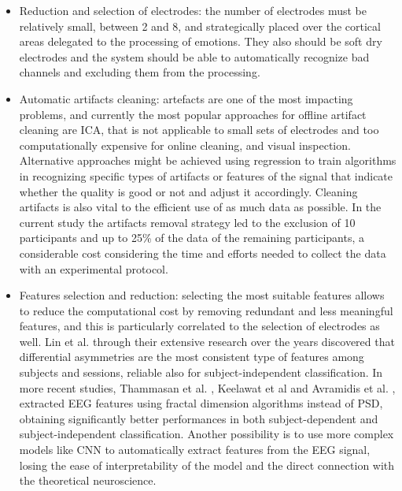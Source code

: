 \begin{itemize}
\item 	Reduction and selection of electrodes: the number of electrodes must be relatively small, between 2 and 8, and strategically placed over the cortical areas delegated to the processing of emotions. They also should be soft dry electrodes and the system should be able to automatically recognize bad channels and excluding them from the processing.
\item 	Automatic artifacts cleaning: artefacts are one of the most impacting problems, and currently the most popular approaches for offline artifact cleaning are \ac{ICA}, that is not applicable to small sets of electrodes and too computationally expensive for online cleaning, and visual inspection. Alternative approaches might be achieved using regression to train algorithms in recognizing specific types of artifacts or features of the signal that indicate whether the quality is good or not and adjust it accordingly. Cleaning artifacts is also vital to the efficient use of as much data as possible. In the current study the artifacts removal strategy led to the exclusion of 10 participants and up to 25\% of the data of the remaining participants, a considerable cost considering the time and efforts needed to collect the data with an experimental protocol.
\item 	Features selection and reduction: selecting the most suitable features allows to reduce the computational cost by removing redundant and less meaningful features, and this is particularly correlated to the selection of electrodes as well. Lin et al. \cite{lin_toward_2015} through their extensive research over the years discovered that differential asymmetries are the most consistent type of features among subjects and sessions, reliable also for subject-independent classification. In more recent studies, Thammasan et al. \cite{thammasan_continuous_2016}, Keelawat et al \cite{keelawat_comparative_2021} and Avramidis et al. \cite{avramidis_multiscale_2021} , extracted \ac{EEG} features using fractal dimension algorithms instead of \ac{PSD}, obtaining significantly better performances in both subject-dependent and subject-independent classification. Another possibility is to use more complex models like \ac{CNN} \cite{keelawat_comparative_2021} to automatically extract features from the \ac{EEG} signal, losing the ease of interpretability of the model and the direct connection with the theoretical neuroscience.

\end{itemize}
